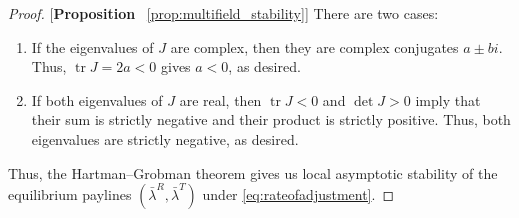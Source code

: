\begin{proof}{[\textbf{Proposition} ~\ref{prop:multifield_stability}]}
There are two cases:
\begin{enumerate}[label=(\arabic*),ref=\thelemma(\arabic*)]
  \item If the eigenvalues of $J$ are complex, then they are complex conjugates $a\pm bi$. Thus, $\operatorname{tr} J = 2a < 0$ gives $a<0$, as desired. 
  \item If both eigenvalues of $J$ are real, then $\operatorname{tr} J<0$ and $\operatorname{det} J>0$ imply that their sum is strictly negative and their product is strictly positive. Thus, both eigenvalues are strictly negative, as desired. 
\end{enumerate}
Thus, the Hartman--Grobman theorem gives us local asymptotic stability of the equilibrium paylines $(\bar{\lambda}^R,\bar{\lambda}^T)$ under \eqref{eq:rateofadjustment}.  
\end{proof}

